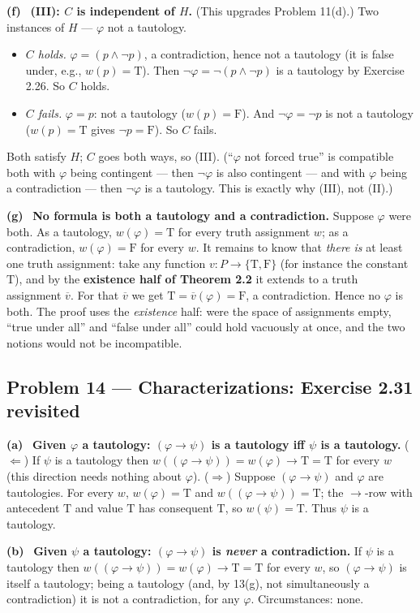 \documentclass[11pt]{article}
\newcommand{\T}{\mathrm{T}}
\newcommand{\F}{\mathrm{F}}
\newcommand{\TF}{\{\T,\F\}}
\newcommand{\ext}[1]{\overline{#1}}
\newcommand{\solpart}[1]{\smallskip\noindent\textbf{(#1)}\ }
\newcommand{\prob}[2]{\subsection*{Problem #1 --- #2}}
\begin{document}
\solpart{f} \textbf{(III): $C$ is independent of $H$.} (This upgrades Problem
11(d).) Two instances of $H$ --- $\varphi$ not a tautology.
\begin{itemize}[nosep]
\item \emph{$C$ holds.} $\varphi=(p\land\lnot p)$, a contradiction, hence not a
tautology (it is false under, e.g., $w(p)=\T$). Then $\lnot\varphi=\lnot(p\land
\lnot p)$ is a tautology by Exercise 2.26. So $C$ holds.
\item \emph{$C$ fails.} $\varphi=p$: not a tautology ($w(p)=\F$). And $\lnot\varphi
=\lnot p$ is not a tautology ($w(p)=\T$ gives $\lnot p=\F$). So $C$ fails.
\end{itemize}
Both satisfy $H$; $C$ goes both ways, so (III). (``$\varphi$ not forced true'' is
compatible both with $\varphi$ being contingent --- then $\lnot\varphi$ is also
contingent --- and with $\varphi$ being a contradiction --- then $\lnot\varphi$ is
a tautology. This is exactly why (III), not (II).)

\solpart{g} \textbf{No formula is both a tautology and a contradiction.} Suppose
$\varphi$ were both. As a tautology, $w(\varphi)=\T$ for every truth assignment $w$;
as a contradiction, $w(\varphi)=\F$ for every $w$. It remains to know that
\emph{there is} at least one truth assignment: take any function $v\colon P\to\TF$
(for instance the constant $\T$), and by the \textbf{existence half of Theorem 2.2}
it extends to a truth assignment $\ext{v}$. For that $\ext{v}$ we get
$\T=\ext{v}(\varphi)=\F$, a contradiction. Hence no $\varphi$ is both. The proof
uses the \emph{existence} half: were the space of assignments empty, ``true under
all'' and ``false under all'' could hold vacuously at once, and the two notions
would not be incompatible.

\prob{14}{Characterizations: Exercise 2.31 revisited}

\solpart{a} \textbf{Given $\varphi$ a tautology: $(\varphi\to\psi)$ is a tautology
iff $\psi$ is a tautology.}
($\Leftarrow$) If $\psi$ is a tautology then $w((\varphi\to\psi))=w(\varphi)\to\T=
\T$ for every $w$ (this direction needs nothing about $\varphi$).
($\Rightarrow$) Suppose $(\varphi\to\psi)$ and $\varphi$ are tautologies. For every
$w$, $w(\varphi)=\T$ and $w((\varphi\to\psi))=\T$; the $\to$-row with antecedent
$\T$ and value $\T$ has consequent $\T$, so $w(\psi)=\T$. Thus $\psi$ is a tautology.

\solpart{b} \textbf{Given $\psi$ a tautology: $(\varphi\to\psi)$ is \emph{never} a
contradiction.} If $\psi$ is a tautology then $w((\varphi\to\psi))=w(\varphi)\to\T=
\T$ for every $w$, so $(\varphi\to\psi)$ is itself a tautology; being a tautology
(and, by 13(g), not simultaneously a contradiction) it is not a contradiction, for
any $\varphi$. Circumstances: none.
\end{document}
